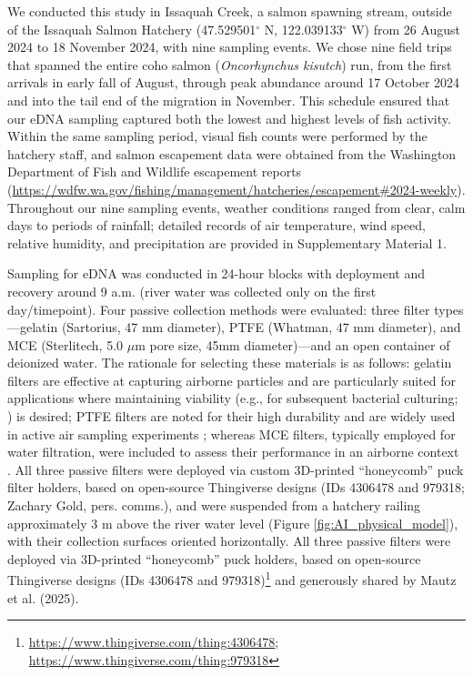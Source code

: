\documentclass{article}
\begin{document}
We conducted this study in Issaquah Creek, a salmon spawning stream, outside of the Issaquah Salmon Hatchery (47.529501$^\circ$ N, 122.039133$^\circ$ W) from 26 August 2024 to 18 November 2024, with nine sampling events. We chose nine field trips that spanned the entire coho salmon (\textit{Oncorhynchus kisutch}) run, from the first arrivals in early fall of August, through peak abundance around 17 October 2024 and into the tail end of the migration in November. This schedule ensured that our eDNA sampling captured both the lowest and highest levels of fish activity. Within the same sampling period, visual fish counts were performed by the hatchery staff, and salmon escapement data were obtained from the Washington Department of Fish and Wildlife escapement reports (\href{https://wdfw.wa.gov/fishing/management/hatcheries/escapement#2024-weekly}{https://wdfw.wa.gov/fishing/management/hatcheries/escapement\#2024-weekly}). Throughout our nine sampling events, weather conditions ranged from clear, calm days to periods of  rainfall; detailed records of air temperature, wind speed, relative humidity, and precipitation are provided in Supplementary Material 1.

Sampling for eDNA was conducted in 24-hour blocks with deployment and recovery around 9 a.m. (river water was collected only on the first day/timepoint). Four passive collection methods were evaluated: three filter types—gelatin (Sartorius, 47 mm diameter), PTFE (Whatman, 47 mm diameter), and MCE (Sterlitech, 5.0 $\mu$m pore size, 45mm diameter)—and an open container of deionized water. The rationale for selecting these materials is as follows: gelatin filters are effective at capturing airborne particles and are particularly suited for applications where maintaining viability (e.g., for subsequent bacterial culturing; \cite{wu2010}) is desired; PTFE filters are noted for their high durability and are widely used in active air sampling experiments \cite{harnpicharnchai2023}; whereas MCE filters, typically employed for water filtration, were included to assess their performance in an airborne context \cite{allan2023}. All three passive filters were deployed via custom 3D-printed “honeycomb” puck filter holders, based on open-source Thingiverse designs (IDs 4306478 and 979318; Zachary Gold, pers. comms.), and were suspended from a hatchery railing approximately 3 m above the river water level (Figure \ref{fig:AI_physical_model}), with their collection surfaces oriented horizontally. All three passive filters were deployed via 3D-printed “honeycomb” puck holders, based on open-source Thingiverse designs (IDs 4306478 and 979318)\footnote{\url{https://www.thingiverse.com/thing:4306478}; \url{https://www.thingiverse.com/thing:979318}} and generously shared by Mautz et al. (2025).
\end{document}

